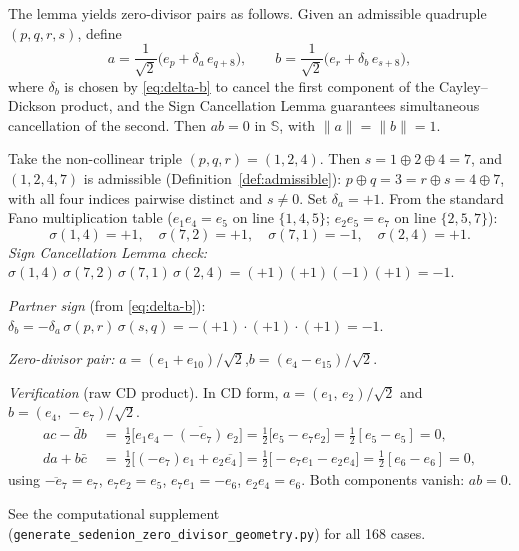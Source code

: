 The lemma yields zero-divisor pairs as follows.  Given an admissible
quadruple $(p,q,r,s)$, define
\begin{equation}\label{eq:zd-pair-construction}
  a = \frac{1}{\sqrt{2}}\bigl(e_p + \delta_a\, e_{q+8}\bigr),
  \qquad
  b = \frac{1}{\sqrt{2}}\bigl(e_r + \delta_b\, e_{s+8}\bigr),
\end{equation}
where $\delta_b$ is chosen by \eqref{eq:delta-b} to cancel the first
component of the Cayley--Dickson product, and the Sign Cancellation Lemma
guarantees simultaneous cancellation of the second.  Then $ab = 0$ in
$\mathbb{S}$, with $\|a\| = \|b\| = 1$.

\begin{example}\label{ex:worked}
Take the non-collinear triple $(p,q,r) = (1,2,4)$.  Then $s = 1\oplus
2\oplus 4 = 7$, and $(1,2,4,7)$ is admissible
(Definition~\ref{def:admissible}): $p\oplus q = 3 = r\oplus s = 4\oplus
7$, with all four indices pairwise distinct and $s\neq 0$.  Set $\delta_a
= +1$.  From the standard Fano multiplication table ($e_1 e_4 = e_5$ on
line $\{1,4,5\}$; $e_2 e_5 = e_7$ on line $\{2,5,7\}$):
\[
  \sigma(1,4) = +1,\quad \sigma(7,2) = +1,\quad
  \sigma(7,1) = -1,\quad \sigma(2,4) = +1.
\]
\emph{Sign Cancellation Lemma check:}\;
$\sigma(1,4)\,\sigma(7,2)\,\sigma(7,1)\,\sigma(2,4) =
(+1)(+1)(-1)(+1) = -1$.\quad\checkmark

\emph{Partner sign} (from \eqref{eq:delta-b}):\;
$\delta_b = -\delta_a\,\sigma(p,r)\,\sigma(s,q) =
-(+1)\cdot(+1)\cdot(+1) = -1$.

\emph{Zero-divisor pair:}\;
$a = (e_1 + e_{10})/\sqrt{2}$,\quad $b = (e_4 - e_{15})/\sqrt{2}$.

\emph{Verification} (raw CD product).\;
In CD form, $a = (e_1,\,e_2)/\sqrt{2}$ and $b = (e_4,\,-e_7)/\sqrt{2}$.
\begin{align*}
  ac - \bar{d}b \;&=\; \tfrac{1}{2}\bigl[e_1 e_4
    - \overline{(-e_7)}\,e_2\bigr]
    = \tfrac{1}{2}\bigl[e_5 - e_7 e_2\bigr]
    = \tfrac{1}{2}[e_5 - e_5] = 0, \\
  da + b\bar{c} \;&=\; \tfrac{1}{2}\bigl[(-e_7)e_1
    + e_2\overline{e_4}\,\bigr]
    = \tfrac{1}{2}\bigl[-e_7 e_1 - e_2 e_4\bigr]
    = \tfrac{1}{2}[e_6 - e_6] = 0,
\end{align*}
using $\overline{-e_7} = e_7$, $e_7 e_2 = e_5$, $e_7 e_1 = -e_6$,
$e_2 e_4 = e_6$.  Both components vanish: $ab = 0$.\quad\checkmark

See the computational supplement
(\texttt{generate\_sedenion\_zero\_divisor\_geometry.py}) for all 168
cases.
\end{example}


